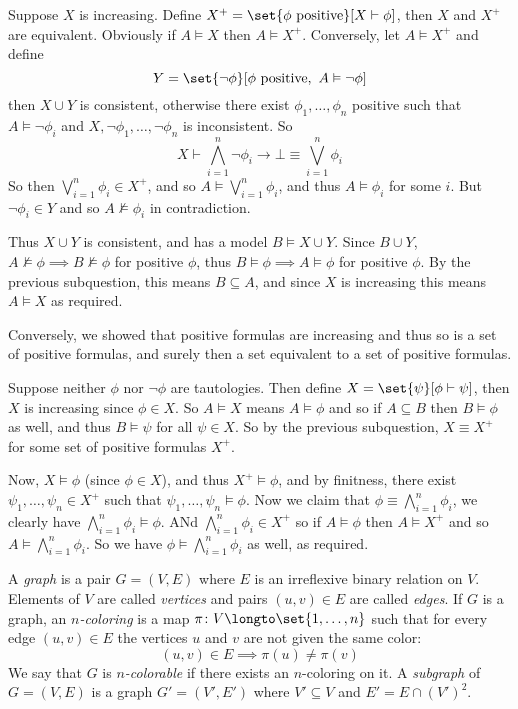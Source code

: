     \item Suppose $X$ is increasing.
    Define $X^+=\set{\phi\hbox{ positive}}[X\vdash\phi]$, then $X$ and $X^+$ are equivalent.
    Obviously if $A\vDash X$ then $A\vDash X^+$.
    Conversely, let $A\vDash X^+$ and define
    $$ Y = \set{\neg\phi}[\phi\hbox{ positive},\ A\vDash\neg\phi] $$
    then $X\cup Y$ is consistent, otherwise there exist $\phi_1,\dots,\phi_n$ positive such that $A\vDash\neg\phi_i$ and $X,\neg\phi_1,\dots,\neg\phi_n$ is inconsistent.
    So
    $$ X\vdash\bigwedge_{i=1}^n\neg\phi_i\to\bot \equiv \bigvee_{i=1}^n\phi_i $$
    So then $\bigvee_{i=1}^n\phi_i\in X^+$, and so $A\vDash\bigvee_{i=1}^n\phi_i$, and thus $A\vDash\phi_i$ for some $i$.
    But $\neg\phi_i\in Y$ and so $A\nvDash\phi_i$ in contradiction.

    Thus $X\cup Y$ is consistent, and has a model $B\vDash X\cup Y$.
    Since $B\cup Y$, $A\nvDash\phi\implies B\nvDash\phi$ for positive $\phi$, thus $B\vDash\phi\implies A\vDash\phi$ for positive $\phi$.
    By the previous subquestion, this means $B\subseteq A$, and since $X$ is increasing this means $A\vDash X$ as required.

    Conversely, we showed that positive formulas are increasing and thus so is a set of positive formulas, and surely then a set equivalent to a set of positive formulas.

    \item Suppose neither $\phi$ nor $\neg\phi$ are tautologies.
    Then define $X=\set{\psi}[\phi\vdash\psi]$, then $X$ is increasing since $\phi\in X$.
    So $A\vDash X$ means $A\vDash\phi$ and so if $A\subseteq B$ then $B\vDash\phi$ as well, and thus $B\vDash\psi$ for all $\psi\in X$.
    So by the previous subquestion, $X\equiv X^+$ for some set of positive formulas $X^+$.

    Now, $X\vDash\phi$ (since $\phi\in X$), and thus $X^+\vDash\phi$, and by finitness, there exist $\psi_1,\dots,\psi_n\in X^+$ such that $\psi_1,\dots,\psi_n\vDash\phi$.
    Now we claim that $\phi\equiv\bigwedge_{i=1}^n\phi_i$, we clearly have $\bigwedge_{i=1}^n\phi_i\vDash\phi$.
    ANd $\bigwedge_{i=1}^n\phi_i\in X^+$ so if $A\vDash\phi$ then $A\vDash X^+$ and so $A\vDash\bigwedge_{i=1}^n\phi_i$.
    So we have $\phi\vDash\bigwedge_{i=1}^n\phi_i$ as well, as required.
\eenum

\bprob

    A {\it graph} is a pair $G=(V,E)$ where $E$ is an irreflexive binary relation on $V$.
    Elements of $V$ are called {\it vertices} and pairs $(u,v)\in E$ are called {\it edges}.
    If $G$ is a graph, an {\it $n$-coloring} is a map $\pi\colon V\longto\set{1,\dots,n}$ such that for every edge $(u,v)\in E$ the vertices $u$ and $v$ are not given the same color:
    $$ (u,v)\in E\implies \pi(u)\neq\pi(v) $$
    We say that $G$ is {\it $n$-colorable} if there exists an $n$-coloring on it.
    A {\it subgraph} of $G=(V,E)$ is a graph $G'=(V',E')$ where $V'\subseteq V$ and $E'=E\cap(V')^2$.

